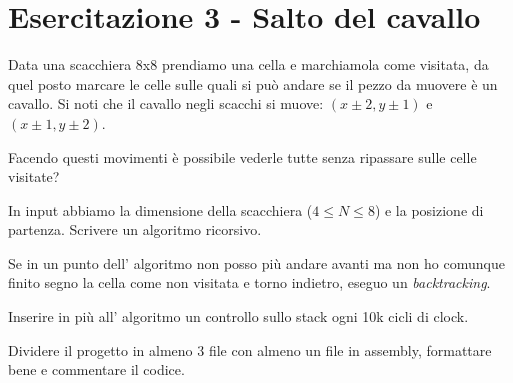 \section{Esercitazione 3 - Salto del cavallo}
Data una scacchiera 8x8 prendiamo una cella e marchiamola come visitata, da quel posto marcare le celle sulle quali si può andare se il pezzo da muovere è un cavallo.
Si noti che il cavallo negli scacchi si muove: $(x \pm 2, y \pm 1)$ e $(x \pm 1, y \pm 2)$.

Facendo questi movimenti è possibile vederle tutte senza ripassare sulle celle visitate?

In input abbiamo la dimensione della scacchiera ($4 \leq N \leq 8$) e la posizione di partenza.
Scrivere un algoritmo ricorsivo.

Se in un punto dell' algoritmo non posso più andare avanti ma non ho comunque finito segno la cella come non visitata e torno indietro, eseguo un \emph{backtracking}.

Inserire in più all' algoritmo un controllo sullo stack ogni 10k cicli di clock.

Dividere il progetto in almeno 3 file con almeno un file in assembly, formattare bene e commentare il codice.

